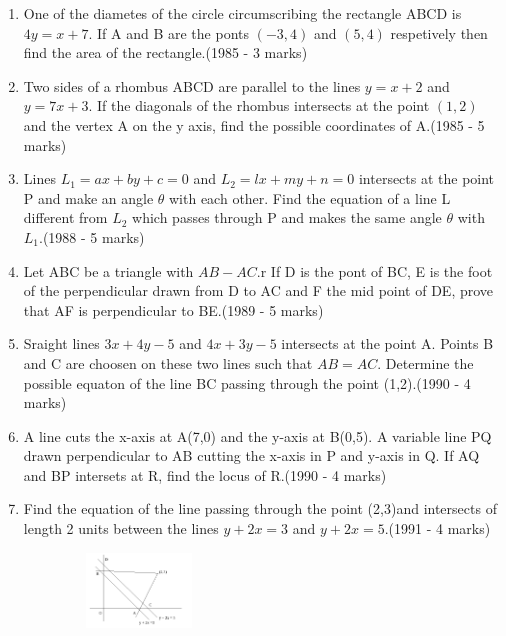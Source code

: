 \documentclass[12pt]{article}
\begin{document}
\begin{enumerate}
\item One of the diametes of the circle circumscribing the rectangle ABCD is $4y=x+7$. If A and B are the ponts $(-3,4)$ and $(5,4)$ respetively then find the area of the rectangle.(1985 - 3 marks)\\
\item Two sides of a rhombus ABCD are parallel to the lines $y=x+2$ and $y=7x+3$. If the diagonals of the rhombus intersects at the point $(1,2)$ and the vertex A on the y axis, find the possible coordinates of A.(1985 - 5 marks)\\
\item Lines $L_1=ax+by+c=0$ and $L_2=lx+my+n=0$ intersects at the point P and make an angle $\theta$ with each other. Find the equation of a line L different from $L_2$ which passes through P and makes the same angle $\theta$ with $L_1$.(1988 - 5 marks)\\
\item Let ABC be a triangle with $AB-AC$.r If D is the pont of BC, E is the foot of the perpendicular drawn from D to AC and F the mid point of DE, prove that AF is perpendicular to BE.(1989 - 5 marks)\\
\item Sraight lines $3x+4y-5$ and $4x+3y-5$ intersects at the point A. Points B and C 
are choosen on these two lines such that $AB=AC$. Determine the possible equaton of the line BC passing through the point (1,2).(1990 - 4 marks)\\
\item A line cuts the x-axis at A(7,0) and the y-axis at B(0,5). A variable line PQ drawn perpendicular to AB cutting the x-axis  in P and y-axis in Q. If AQ and BP intersets at R, find the locus of R.(1990 - 4 marks)\\
\item Find the equation of the line passing through the point (2,3)and intersects of length 2 units between the lines $y+2x=3$ and $y+2x=5$.(1991 - 4 marks)\\
 
 \begin{figure}[h]
\centering
    \includegraphics[width=4cm, height=2cm]{fig.png}
     \end{figure}
     

\end{enumerate}
\end{document}
